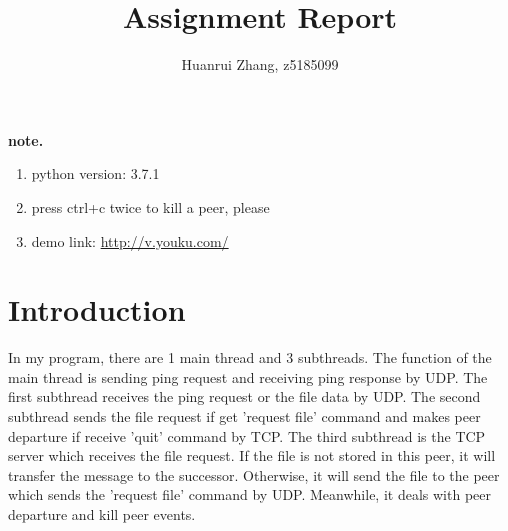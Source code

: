 \documentclass{article}
\begin{document}
	\title{Assignment Report}
	\author{Huanrui Zhang, z5185099}
	\date{}
	\maketitle
	\textbf{note.} \par
	\begin{enumerate}
		\item python version: 3.7.1
		\item press ctrl+c twice to kill a peer, please
		\item demo link: \href{http://v.youku.com/}{http://v.youku.com/}
	\end{enumerate}

	\section{Introduction}
		In my program, there are 1 main thread and 3 subthreads. The function of the main thread is sending ping request and receiving ping response by UDP. The first subthread receives the ping request or the file data by UDP. The second subthread sends the file request if get 'request file' command and makes peer departure if receive 'quit' command by TCP. The third subthread is the TCP server which receives the file request. If the file is not stored in this peer, it will transfer the message to the successor. Otherwise, it will send the file to the peer which sends the 'request file' command by UDP. Meanwhile, it deals with peer departure and kill peer events.
	
\end{document}
